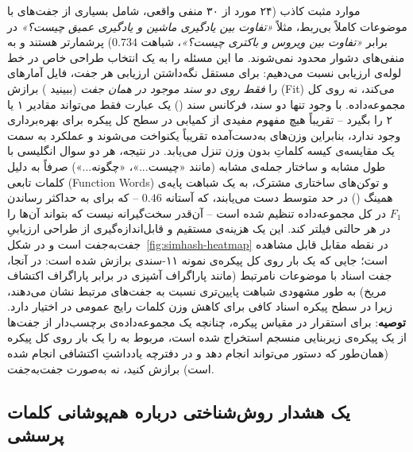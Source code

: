 \documentclass[11pt,a4paper]{article}
\begin{document}
	موارد مثبت کاذب  (۲۴ مورد از ۳۰ منفی واقعی، شامل بسیاری از جفت‌های  با موضوعات کاملاً بی‌ربط، مثلاً \emph{«تفاوت بین یادگیری ماشین و یادگیری عمیق چیست؟»} در برابر \emph{«تفاوت بین ویروس و باکتری چیست؟»}، شباهت $0.734$) پرشمارتر هستند و به منفی‌های دشوار محدود نمی‌شوند. ما این مسئله را به یک انتخاب طراحی خاص در خط لوله‌ی ارزیابی  نسبت می‌دهیم: برای مستقل نگه‌داشتن ارزیابی هر جفت، فایل  آمارهای  را \emph{فقط روی دو سند موجود در همان جفت} (ببینید ) برازش (Fit) می‌کند، نه روی کل مجموعه‌داده. با وجود تنها دو سند، فرکانس سند () یک عبارت فقط می‌تواند مقادیر ۱ یا ۲ را بگیرد -- تقریباً هیچ مفهوم مفیدی از کمیابی در سطح کل پیکره برای بهره‌برداری وجود ندارد، بنابراین وزن‌های به‌دست‌آمده تقریباً یکنواخت می‌شوند و عملکرد  به سمت یک مقایسه‌ی کیسه کلماتِ بدون وزن تنزل می‌یابد. در نتیجه، هر دو سوال انگلیسی با طول مشابه و ساختار جمله‌ی مشابه (مانند «چیست...»، «چگونه...») صرفاً به دلیل کلمات تابعی (Function Words) و توکن‌های ساختاری مشترک، به یک شباهت پایه‌ی همینگ () در حد متوسط دست می‌یابند، که آستانه $0.46$ -- که برای به حداکثر رساندن $F_1$ در کل مجموعه‌داده تنظیم شده است -- آن‌قدر سخت‌گیرانه نیست که بتواند آن‌ها را در هر حالتی فیلتر کند. این یک هزینه‌ی مستقیم و قابل‌اندازه‌گیری از طراحی ارزیابیِ جفت‌به‌جفت است و در شکل~\ref{fig:simhash-heatmap} در نقطه مقابل قابل مشاهده است؛ جایی که  یک بار روی کل پیکره‌ی نمونه ۱۱-سندی برازش شده است: در آنجا، جفت اسناد با موضوعات نامرتبط (مانند پاراگراف آشپزی در برابر پاراگراف اکتشاف مریخ) به طور مشهودی شباهت پایین‌تری نسبت به جفت‌های مرتبط نشان می‌دهند، زیرا  در سطح پیکره اسناد کافی برای کاهش وزن کلمات رایج عمومی در اختیار دارد. \textbf{توصیه}: برای استقرار در مقیاس پیکره، چنانچه یک مجموعه‌داده‌ی برچسب‌دار از جفت‌ها از یک پیکره‌ی زیربنایی منسجم استخراج شده است،  مربوط به  را یک بار روی کل پیکره (همان‌طور که دستور  می‌تواند انجام دهد و در دفترچه یادداشتِ اکتشافی انجام شده است) برازش کنید، نه به‌صورت جفت‌به‌جفت.
	
	\subsection{یک هشدار روش‌شناختی درباره هم‌پوشانی کلمات پرسشی}
	
\end{document}
